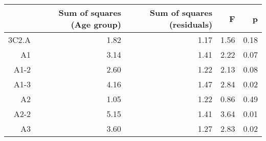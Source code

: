\begin{table}[ht]
\centering
\begin{tabular}{rrrrr}
  \hline
 & Sum of squares (Age group) & Sum of squares (residuals) & F & p \\ 
  \hline
3C2.A & 1.82 & 1.17 & 1.56 & 0.18 \\ 
  A1 & 3.14 & 1.41 & 2.22 & 0.07 \\ 
  A1-2 & 2.60 & 1.22 & 2.13 & 0.08 \\ 
  A1-3 & 4.16 & 1.47 & 2.84 & 0.02 \\ 
  A2 & 1.05 & 1.22 & 0.86 & 0.49 \\ 
  A2-2 & 5.15 & 1.41 & 3.64 & 0.01 \\ 
  A3 & 3.60 & 1.27 & 2.83 & 0.02 \\ 
   \hline
\end{tabular}
\end{table}
